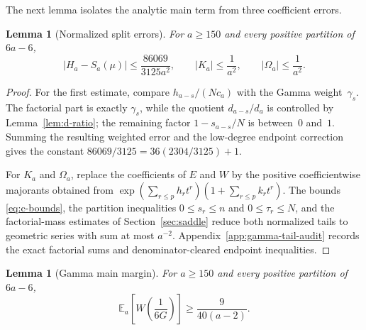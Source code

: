 \documentclass[11pt]{article}
\newtheorem{lemma}[theorem]{Lemma}
\theoremstyle{definition}
\theoremstyle{remark}
\begin{document}
The next lemma isolates the analytic main term from three coefficient errors.

\begin{lemma}[Normalized split errors]\label{lem:printed-split-errors}
For $a\ge150$ and every positive partition of $6a-6$,
\begin{equation}\label{eq:printed-errors52}
 \left|H_a-S_a(\mu)\right|
   \le\frac{86069}{3125a^2},
 \qquad
 |K_a|\le\frac1{a^2},
 \qquad
 |\Omega_a|\le\frac1{a^2}.
\end{equation}
\end{lemma}

\begin{proof}
For the first estimate, compare
$h_{a-s}/(Nc_a)$ with the Gamma weight~$\gamma_s$.  The factorial part is
exactly $\gamma_s$, while the quotient $d_{a-s}/d_a$ is controlled by
Lemma~\ref{lem:d-ratio}; the remaining factor $1-s_{a-s}/N$ is between~$0$
and~$1$.  Summing the resulting weighted error and the low-degree endpoint
correction gives the constant
$86069/3125=36(2304/3125)+1$.

For $K_a$ and $\Omega_a$, replace the coefficients of $E$ and $W$ by the
positive coefficientwise majorants obtained from
$\exp(\sum_{r\le p}h_rt^r)(1+\sum_{r\le p}k_rt^r)$.  The bounds
\eqref{eq:c-bounds}, the partition inequalities $0\le s_r\le n$ and
$0\le\tau_r\le N$, and the factorial-mass estimates of
Section~\ref{sec:saddle} reduce both normalized tails to geometric series with
sum at most $a^{-2}$.  Appendix~\ref{app:gamma-tail-audit} records the exact
factorial sums and denominator-cleared endpoint inequalities.
\end{proof}

\begin{lemma}[Gamma main margin]\label{lem:gamma-main-margin}
For $a\ge150$ and every positive partition of $6a-6$,
\begin{equation}\label{eq:gamma-expectation-margin}
  \mathbb E_a\!\left[W\!\left(\frac1{6G}\right)\right]
  \ge\frac9{40(a-2)}.
\end{equation}
\end{lemma}
\end{document}
